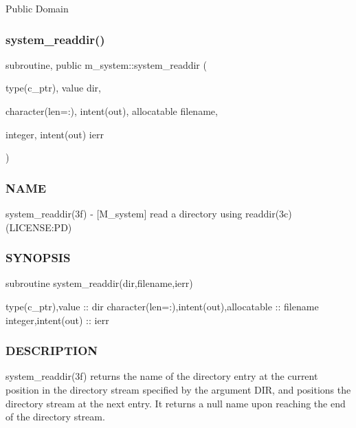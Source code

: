 Public Domain \mbox{\label{namespacem__system_a983df5b2d7cb5842d69c4a31829403e0}} 
\subsubsection{\texorpdfstring{system\+\_\+readdir()}{system\_readdir()}}
{\footnotesize\ttfamily subroutine, public m\+\_\+system\+::system\+\_\+readdir (\begin{DoxyParamCaption}\item[{type(c\+\_\+ptr), value}]{dir,  }\item[{character(len=\+:), intent(out), allocatable}]{filename,  }\item[{integer, intent(out)}]{ierr }\end{DoxyParamCaption})}



\subsubsection*{N\+A\+ME}

system\+\_\+readdir(3f) -\/ \mbox{[}M\+\_\+system\mbox{]} read a directory using readdir(3c) (L\+I\+C\+E\+N\+SE\+:PD) \subsubsection*{S\+Y\+N\+O\+P\+S\+IS}

subroutine system\+\_\+readdir(dir,filename,ierr)

type(c\+\_\+ptr),value \+:\+: dir character(len=\+:),intent(out),allocatable \+:\+: filename integer,intent(out) \+:\+: ierr

\subsubsection*{D\+E\+S\+C\+R\+I\+P\+T\+I\+ON}

\begin{DoxyVerb}system_readdir(3f) returns the name of the directory entry at the
current position in the directory stream specified by the argument
DIR, and positions the directory stream at the next entry. It returns
a null name upon reaching the end of the directory stream.
\end{DoxyVerb}


